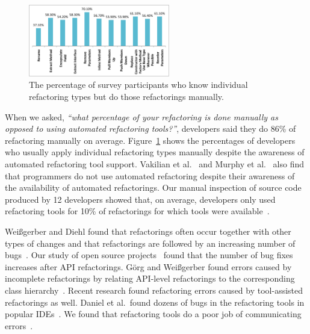 \documentclass[runningheads,a4paper]{llncs}
\begin{document}
\begin{figure}
\vspace*{-1ex}
    \includegraphics[width=0.55\textwidth]{images/manualRefactoring.pdf}
\centering
\caption{The percentage of survey participants who know individual refactoring types but do those refactorings manually.} 
\label{fig:manualRefactoring} 
\end{figure} 

When we asked, {\it ``what percentage of your refactoring is done manually as opposed to using automated refactoring tools?''}, developers said they do 86\% of refactoring manually on average. Figure~\ref{fig:manualRefactoring} shows the percentages of developers who usually apply individual refactoring types manually despite the awareness of automated refactoring tool support. Vakilian et al.~\cite{Vakilian2012:usedisuse} and Murphy et al.~\cite{Murphy2006:JSD} also find that programmers do not use automated refactoring despite their awareness of the availability of automated refactorings. 
Our manual inspection of source code produced by 12 developers showed that, on average,
developers only used refactoring tools for 10\% of refactorings for which tools were
available~\cite{murphyHill10a}.

 Wei{\ss}gerber and Diehl found that refactorings often occur together with other types of changes and that refactorings are followed by an increasing number of bugs~\cite{Weissgerber2006:refactor}. Our study of open source projects~\cite{Kim2011:refactorbug} found that the number of bug fixes increases after API refactorings. G{\"o}rg and Wei{\ss}gerber found errors caused by incomplete refactorings by relating API-level refactorings to the corresponding class hierarchy~\cite{Weissgerber2006:refactor}. Recent research found refactoring errors caused by tool-assisted refactorings as well. Daniel et al.~found dozens of bugs in the refactoring tools in popular IDEs~\cite{Brett2007:reftest}. We found that refactoring tools do a poor job of communicating errors~\cite{Murphy-Hill2009:refactor}. 
\end{document}
